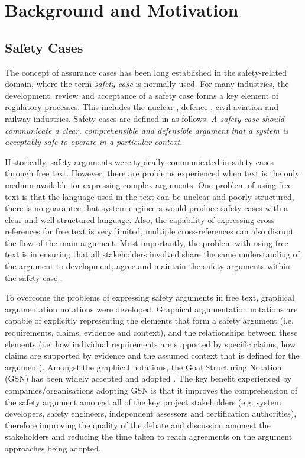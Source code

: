 \section{Background and Motivation}
\label{sec:background}

\subsection{Safety Cases}
The concept of assurance cases has been long established in the safety-related domain, where the term \textit{safety case} is normally used. 
For many industries, the development, review and acceptance of a safety case forms a key element of regulatory processes. This includes the nuclear \cite{hse}, defence \cite{mod2007}, civil aviation \cite{caa2007} and railway \cite{yellowBook2007} industries. 
Safety cases are defined in \cite{kelly2004goal} as follows: \textit{A safety case should communicate a clear, comprehensible and defensible argument that a system is acceptably safe to operate in a particular context}. 

Historically, safety arguments were typically communicated in safety cases through free text. However, there are problems experienced when text is the only medium available for expressing complex arguments. 
One problem of using free text is that the language used in the text can be unclear and poorly structured, there is no guarantee that system engineers would produce safety cases with a clear and well-structured language. 
Also, the capability of expressing cross-references for free text is very limited, multiple cross-references can also disrupt the flow of the main argument. 
Most importantly, the problem with using free text is in ensuring that all stakeholders involved share the same understanding of the argument to development, agree and maintain the safety arguments within the safety case \cite{kelly2004goal}.

To overcome the problems of expressing safety arguments in free text, graphical argumentation notations were developed. 
Graphical argumentation notations are capable of explicitly representing the elements that form a safety argument (i.e. requirements, claims, evidence and context), and the relationships between these elements (i.e. how individual requirements are supported by specific claims, how claims are supported by evidence and the assumed context that is defined for the argument). 
Amongst the graphical notations, the Goal Structuring Notation (GSN) \cite{kelly2004goal} has been widely accepted and adopted \cite{chinneck2004turning}. 
The key benefit experienced by companies/organisations adopting GSN is that it improves the comprehension of the safety argument amongst all of the key project stakeholders (e.g. system developers, safety engineers, independent assessors and certification authorities), therefore improving the quality of the debate and discussion amongst the stakeholders and reducing the time taken to reach agreements on the argument approaches being adopted.

